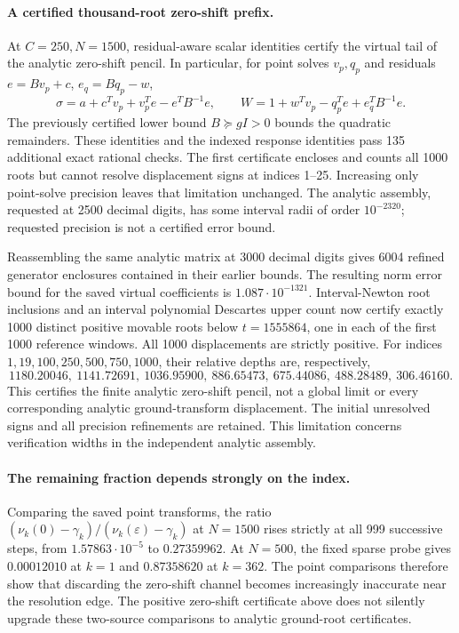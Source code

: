 \paragraph{A certified thousand-root zero-shift prefix.}
At $C=250,N=1500$, residual-aware scalar identities certify the virtual
tail of the analytic zero-shift pencil. In particular, for point solves
$v_p,q_p$ and residuals $e=Bv_p+c$, $e_q=Bq_p-w$,
\[
 \sigma=a+c^Tv_p+v_p^Te-e^TB^{-1}e,\qquad
 W=1+w^Tv_p-q_p^Te+e_q^TB^{-1}e.
\]
The previously certified lower bound $B\succeq gI>0$ bounds the
quadratic remainders. These identities and the indexed response
identities pass 135 additional exact rational checks.
The first certificate encloses and counts all 1000 roots but cannot
resolve displacement signs at indices 1--25. Increasing only point-solve
precision leaves that limitation unchanged. The analytic assembly,
requested at 2500 decimal digits, has some interval radii of order
$10^{-2320}$; requested precision is not a certified error bound.

Reassembling the same analytic matrix at 3000 decimal digits gives
6004 refined generator enclosures contained in their earlier bounds.
The resulting norm error bound for the saved virtual coefficients is
$1.087\cdot10^{-1321}$. Interval-Newton root inclusions and an interval
polynomial Descartes upper count now certify exactly 1000 distinct
positive movable roots below $t=1555864$, one in each of the first
1000 reference windows. All 1000 displacements are strictly positive.
For indices $1,19,100,250,500,750,1000$, their relative depths are,
respectively,
\[
1180.20046,\ 1141.72691,\ 1036.95900,\ 886.65473,\
675.44086,\ 488.28489,\ 306.46160.
\]
This certifies the finite analytic zero-shift pencil, not a global
limit or every corresponding analytic ground-transform displacement.
The initial unresolved signs and all precision refinements are retained.
This limitation concerns verification widths in the independent analytic
assembly.

\paragraph{The remaining fraction depends strongly on the index.}
Comparing the saved point transforms, the ratio
$(\nu_k(0)-\gamma_k)/(\nu_k(\varepsilon)-\gamma_k)$ at
$N=1500$ rises strictly at all 999 successive steps, from
$1.57863\cdot10^{-5}$ to $0.27359962$.
At $N=500$, the fixed sparse probe gives $0.00012010$ at $k=1$
and $0.87358620$ at $k=362$.
The point comparisons therefore show that discarding the zero-shift
channel becomes increasingly inaccurate near the resolution edge.
The positive zero-shift certificate above does not silently upgrade
these two-source comparisons to analytic ground-root certificates.

